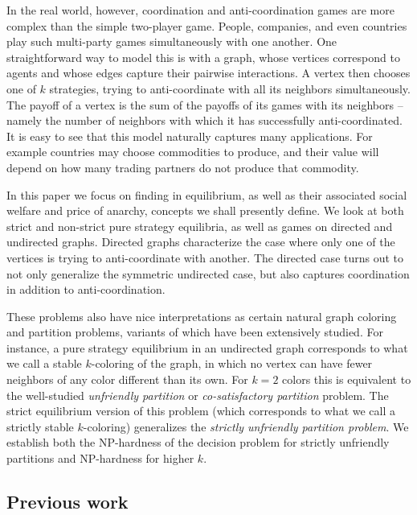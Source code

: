 \documentclass{llncs}
\begin{document}
In the real world, however, coordination and anti-coordination games are more
complex than the simple two-player game.  People, companies, and even countries
play such multi-party games simultaneously with one another. One
straightforward way to model this is with a graph, whose vertices correspond to
agents and whose edges capture their pairwise interactions.  A vertex then
chooses one of $k$ strategies, trying to anti-coordinate with all its neighbors
simultaneously.  The payoff of a vertex is the sum of the payoffs of its games
with its neighbors -- namely the number of neighbors with which it has
successfully anti-coordinated.  It is easy to see that this model naturally
captures many applications.  For example countries may choose commodities to
produce, and their value will depend on how many trading partners do not
produce that commodity.

In this paper we focus on finding  in equilibrium,
as well as their associated social welfare and price of anarchy, concepts we
shall presently define.  We look at both strict and non-strict  pure strategy
equilibria, as well as games on directed and undirected graphs.  Directed graphs
characterize the case where only one of the vertices is trying to anti-coordinate
with another.  The directed case turns out to not only generalize the symmetric
undirected case, but also captures coordination in addition to
anti-coordination.

These problems also have nice interpretations as certain natural graph coloring
and partition problems, variants of which have been extensively studied.  For
instance, a pure strategy equilibrium in an undirected graph corresponds to
what we call a stable $k$-coloring of the graph, in which no vertex can have fewer
neighbors of any color different than its own.  For $k=2$ colors this is equivalent
to the well-studied \emph{unfriendly partition} or \emph{co-satisfactory
partition} problem.  The strict equilibrium version of this problem (which
corresponds to what we call a strictly stable $k$-coloring) generalizes the
\emph{strictly unfriendly partition problem}. We establish both the NP-hardness 
of the decision problem for strictly unfriendly partitions and NP-hardness for higher $k$.


\subsection{Previous work}
\end{document}
